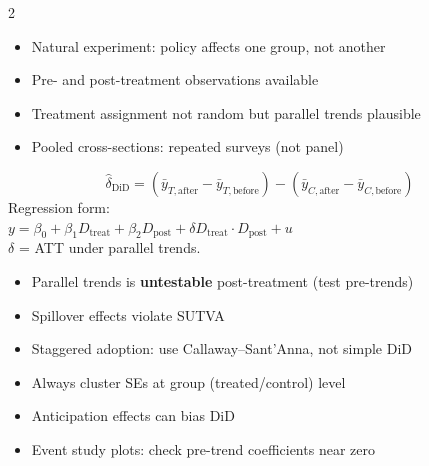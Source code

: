 \documentclass[10pt,a4paper]{article}
\begin{document}
\begin{multicols}{2}

\begin{tcolorbox}[when]
\begin{itemize}
  \item Natural experiment: policy affects one group, not another
  \item Pre- and post-treatment observations available
  \item Treatment assignment not random but parallel trends plausible
  \item Pooled cross-sections: repeated surveys (not panel)
\end{itemize}
\end{tcolorbox}

\begin{tcolorbox}[key]
\[
\hat\delta_{\text{DiD}} = (\bar y_{T,\text{after}} - \bar y_{T,\text{before}}) - (\bar y_{C,\text{after}} - \bar y_{C,\text{before}})
\]
Regression form:\\
$y = \beta_0 + \beta_1 D_{\text{treat}} + \beta_2 D_{\text{post}} + \delta D_{\text{treat}} \cdot D_{\text{post}} + u$\\
$\delta$ = ATT under parallel trends.
\end{tcolorbox}

\columnbreak

\begin{tcolorbox}[watchout]
\begin{itemize}
  \item Parallel trends is \textbf{untestable} post-treatment (test pre-trends)
  \item Spillover effects violate SUTVA
  \item Staggered adoption: use Callaway--Sant'Anna, not simple DiD
  \item Always cluster SEs at group (treated/control) level
  \item Anticipation effects can bias DiD
  \item Event study plots: check pre-trend coefficients near zero
\end{itemize}
\end{tcolorbox}

\end{multicols}
\end{document}

